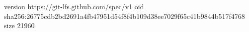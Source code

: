 version https://git-lfs.github.com/spec/v1
oid sha256:26775cdb2bd2691a4fb47951d54f8f4b109d38ee7029f65c41b9844b517f4768
size 21960

